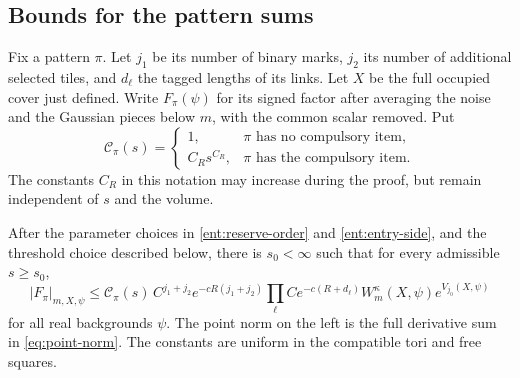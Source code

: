 \subsection{Bounds for the pattern sums}

Fix a pattern \(\pi\).  Let \(j_1\) be its number of binary marks,
\(j_2\) its number of additional selected tiles, and \(d_\ell\)
the tagged lengths of its links.  Let \(X\) be the full occupied
cover just defined.  Write \(F_\pi(\psi)\) for its signed factor
after averaging the noise and the Gaussian pieces below \(m\),
with the common scalar removed.  Put
\[
\mathcal C_\pi(s)=
 \begin{cases}
  1,&\pi\text{ has no compulsory item},\\
  C_Rs^{C_R},&\pi\text{ has the compulsory item}.
 \end{cases}
\]
The constants \(C_R\) in this notation may increase during the proof,
but remain independent of \(s\) and the volume.

\begin{lemma}\label{ent:pattern-estimate}
After the parameter choices in \eqref{ent:reserve-order} and
\eqref{ent:entry-side}, and the threshold choice described below,
there is \(s_0<\infty\) such that for every admissible \(s\ge s_0\),
\begin{equation}\label{ent:analytic-pattern-bound}
 |F_\pi|_{m,X,\psi}
 \le \mathcal C_\pi(s)\,
       C^{j_1+j_2}e^{-cR(j_1+j_2)}
       \prod_\ell Ce^{-c(R+d_\ell)}
       W_m^\kappa(X,\psi)e^{V_{j_0}(X,\psi)}
\end{equation}
for all real backgrounds \(\psi\).  The point norm on the left is
the full derivative sum in \eqref{eq:point-norm}.  The constants
are uniform in the compatible tori and free squares.
\end{lemma}

